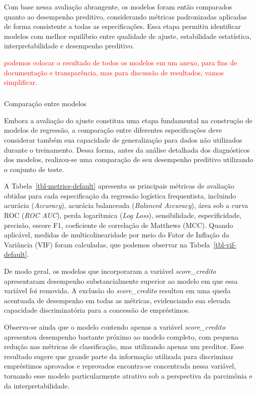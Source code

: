 \documentclass[
  brazilian,
  12pt,
  letterpaper,
  DIV=11,
  numbers=noendperiod]{scrartcl}
\makeatletter
\let\oldsubparagraph\subparagraph
\renewcommand{\subparagraph}{
    \@ifstar
      \xxxSubParagraphStar
      \xxxSubParagraphNoStar
  }
\newcommand{\xxxSubParagraphStar}[1]{\oldsubparagraph*{#1}\mbox{}}
\newcommand{\xxxSubParagraphNoStar}[1]{\oldsubparagraph{#1}\mbox{}}
\newcommand{\red}[1]{\textcolor{red}{#1}}
\makeatother
\begin{document}
Com base nessa avaliação abrangente, os modelos foram então comparados
quanto ao desempenho preditivo, considerando métricas padronizadas
aplicadas de forma consistente a todas as especificações. Essa etapa
permitiu identificar modelos com melhor equilíbrio entre qualidade de
ajuste, estabilidade estatística, interpretabilidade e desempenho
preditivo.

\red{podemos colocar o resultado de todos os modelos em um anexo, para fins de documentação e transparência, mas para discussão de resultados, vamos simplificar.}

\subparagraph{Comparação entre
modelos}\label{comparauxe7uxe3o-entre-modelos}

Embora a avaliação do ajuste constitua uma etapa fundamental na
construção de modelos de regressão, a comparação entre diferentes
especificações deve considerar também sua capacidade de generalização
para dados não utilizados durante o treinamento. Dessa forma, antes da
análise detalhada dos diagnósticos dos modelos, realizou-se uma
comparação de seu desempenho preditivo utilizando o conjunto de teste.

A Tabela~\ref{tbl-metrics-default} apresenta as principais métricas de
avaliação obtidas para cada especificação da regressão logística
frequentista, incluindo acurácia (\emph{Accuracy}), acurácia balanceada
(\emph{Balanced Accuracy}), área sob a curva ROC (\emph{ROC AUC}), perda
logarítmica (\emph{Log Loss}), sensibilidade, especificidade, precisão,
escore F1, coeficiente de correlação de Matthews (MCC). Quando
aplicável, medidas de multicolinearidade por meio do Fator de Inflação
da Variância (VIF) foram calculadas, que podemos observar na
Tabela~\ref{tbl-vif-default}.

De modo geral, os modelos que incorporaram a variável
\emph{score\_credito} apresentaram desempenho substancialmente superior
ao modelo em que essa variável foi removida. A exclusão do
\emph{score\_credito} resultou em uma queda acentuada de desempenho em
todas as métricas, evidenciando sua elevada capacidade discriminatória
para a concessão de empréstimos.

Observa-se ainda que o modelo contendo apenas a variável
\emph{score\_credito} apresentou desempenho bastante próximo ao modelo
completo, com pequena redução nas métricas de classificação, mas
utilizando apenas um preditor. Esse resultado sugere que grande parte da
informação utilizada para discriminar empréstimos aprovados e reprovados
encontra-se concentrada nessa variável, tornando esse modelo
particularmente atrativo sob a perspectiva da parcimônia e da
interpretabilidade.
\end{document}
